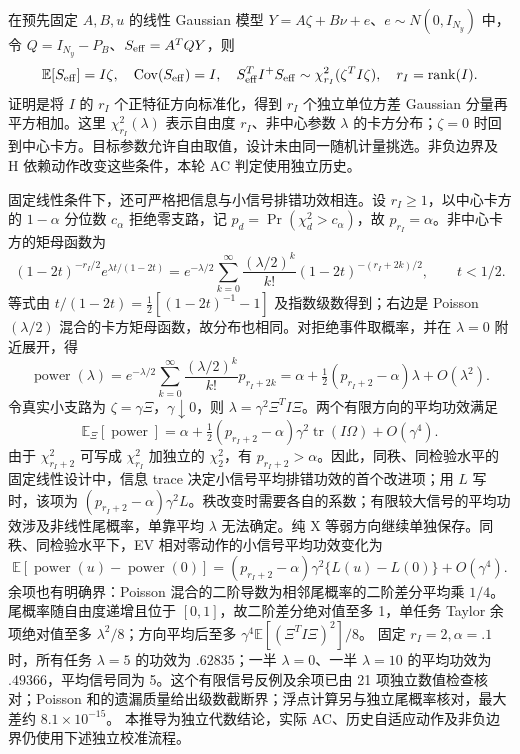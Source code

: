 在预先固定 $A,B,u$ 的线性 Gaussian 模型
$Y=A\zeta+B\nu+e$、$e\sim N(0,I_{N_y})$ 中，令 $Q=I_{N_y}-P_B$、$S_{\rm eff}=A^TQY$，则
\begin{equation}
 \mathbb E[S_{\rm eff}]=I\zeta,\quad
 \operatorname{Cov}(S_{\rm eff})=I,\quad
 S_{\rm eff}^TI^+S_{\rm eff}\sim\chi_{r_I}^2(\zeta^TI\zeta),\quad r_I=\operatorname{rank}(I).
 \label{si:fixed-test}
\end{equation}
证明是将 $I$ 的 $r_I$ 个正特征方向标准化，得到 $r_I$ 个独立单位方差 Gaussian 分量再平方相加。这里 $\chi_{r_I}^2(\lambda)$ 表示自由度 $r_I$、非中心参数 $\lambda$ 的卡方分布；$\zeta=0$ 时回到中心卡方。目标参数允许自由取值，设计未由同一随机计量挑选。非负边界及 H 依赖动作改变这些条件，本轮 AC 判定使用独立历史。

固定线性条件下，还可严格把信息与小信号排错功效相连。设 $r_I\ge1$，以中心卡方的 $1-\alpha$ 分位数 $c_\alpha$ 拒绝零支路，记 $p_d=\Pr(\chi_d^2>c_\alpha)$，故 $p_{r_I}=\alpha$。非中心卡方的矩母函数为
\begin{equation}
 (1-2t)^{-r_I/2}e^{\lambda t/(1-2t)}
 =e^{-\lambda/2}\sum_{k=0}^{\infty}\frac{(\lambda/2)^k}{k!}
 (1-2t)^{-(r_I+2k)/2},\qquad t<1/2.
 \label{si:power-mixture}
\end{equation}
等式由 $t/(1-2t)=\tfrac12[(1-2t)^{-1}-1]$ 及指数级数得到；右边是 Poisson$(\lambda/2)$ 混合的卡方矩母函数，故分布也相同。对拒绝事件取概率，并在 $\lambda=0$ 附近展开，得
\begin{equation}
 \operatorname{power}(\lambda)
 =e^{-\lambda/2}\sum_{k=0}^{\infty}\frac{(\lambda/2)^k}{k!}p_{r_I+2k}
 =\alpha+\tfrac12(p_{r_I+2}-\alpha)\lambda+O(\lambda^2).
 \label{si:power-local}
\end{equation}
令真实小支路为 $\zeta=\gamma\Xi$，$\gamma\downarrow0$，则 $\lambda=\gamma^2\Xi^TI\Xi$。两个有限方向的平均功效满足
\begin{equation}
 \mathbb E_{\Xi}[\operatorname{power}]
 =\alpha+\tfrac12(p_{r_I+2}-\alpha)\gamma^2\operatorname{tr}(I\Omega)
 +O(\gamma^4).
 \label{si:average-power}
\end{equation}
由于 $\chi_{r_I+2}^2$ 可写成 $\chi_{r_I}^2$ 加独立的 $\chi_2^2$，有 $p_{r_I+2}>\alpha$。因此，同秩、同检验水平的固定线性设计中，信息 trace 决定小信号平均排错功效的首个改进项；用 $L$ 写时，该项为 $(p_{r_I+2}-\alpha)\gamma^2L$。秩改变时需要各自的系数；有限较大信号的平均功效涉及非线性尾概率，单靠平均 $\lambda$ 无法确定。纯 X 等弱方向继续单独保存。同秩、同检验水平下，EV 相对零动作的小信号平均功效变化为
\begin{equation}
 \mathbb E[\operatorname{power}(u)-\operatorname{power}(0)]
 =(p_{r_I+2}-\alpha)\gamma^2\{L(u)-L(0)\}+O(\gamma^4).
 \label{si:power-increment}
\end{equation}
余项也有明确界：Poisson 混合的二阶导数为相邻尾概率的二阶差分平均乘 $1/4$。尾概率随自由度递增且位于 $[0,1]$，故二阶差分绝对值至多 1，单任务 Taylor 余项绝对值至多 $\lambda^2/8$；方向平均后至多 $\gamma^4\mathbb E[(\Xi^TI\Xi)^2]/8$。
固定 $r_I=2,\alpha=.1$ 时，所有任务 $\lambda=5$ 的功效为 $.62835$；一半 $\lambda=0$、一半 $\lambda=10$ 的平均功效为 $.49366$，平均信号同为 5。这个有限信号反例及余项已由 21 项独立数值检查核对；Poisson 和的遗漏质量给出级数截断界；浮点计算另与独立尾概率核对，最大差约 $8.1\times10^{-15}$。
本推导为独立代数结论，实际 AC、历史自适应动作及非负边界仍使用下述独立校准流程。

